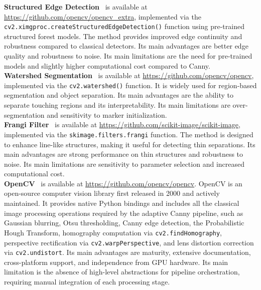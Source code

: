 \documentclass[11pt]{article}
\begin{document}
\textbf{Structured Edge Detection}~\cite{Dollar2013StructuredEdges} is available 
at \url{https://github.com/opencv/opencv_extra}, implemented via the 
\texttt{cv2.ximgproc.createStructuredEdgeDetection()} function using pre-trained 
structured forest models. The method provides improved edge continuity and 
robustness compared to classical detectors. Its main advantages are better edge 
quality and robustness to noise. Its main limitations are the need for pre-trained 
models and slightly higher computational cost compared to Canny.\\

\textbf{Watershed Segmentation}~\cite{Vincent1991Watershed} is available at 
\url{https://github.com/opencv/opencv}, implemented via the 
\texttt{cv2.watershed()} function. It is widely used for region-based segmentation 
and object separation. Its main advantages are the ability to separate touching 
regions and its interpretability. Its main limitations are over-segmentation and 
sensitivity to marker initialization.\\

\textbf{Frangi Filter}~\cite{Frangi1998Vesselness} is available at 
\url{https://github.com/scikit-image/scikit-image}, implemented via the 
\texttt{skimage.filters.frangi} function. The method is designed to enhance 
line-like structures, making it useful for detecting thin separations. Its main 
advantages are strong performance on thin structures and robustness to noise. Its 
main limitations are sensitivity to parameter selection and increased computational 
cost.\\

\textbf{OpenCV}~\cite{opencv_library} is available at 
\url{https://github.com/opencv/opencv}. OpenCV is an open-source computer vision 
library first released in 2000 and actively maintained. It provides native Python 
bindings and includes all the classical image processing operations required by the 
adaptive Canny pipeline, such as Gaussian blurring, Otsu thresholding, Canny edge 
detection, the Probabilistic Hough Transform, homography computation via 
\texttt{cv2.findHomography}, perspective rectification via 
\texttt{cv2.warpPerspective}, and lens distortion correction via 
\texttt{cv2.undistort}. Its main advantages are maturity, extensive documentation, 
cross-platform support, and independence from GPU hardware. Its main limitation is 
the absence of high-level abstractions for pipeline orchestration, requiring manual 
integration of each processing stage.\\
\end{document}
